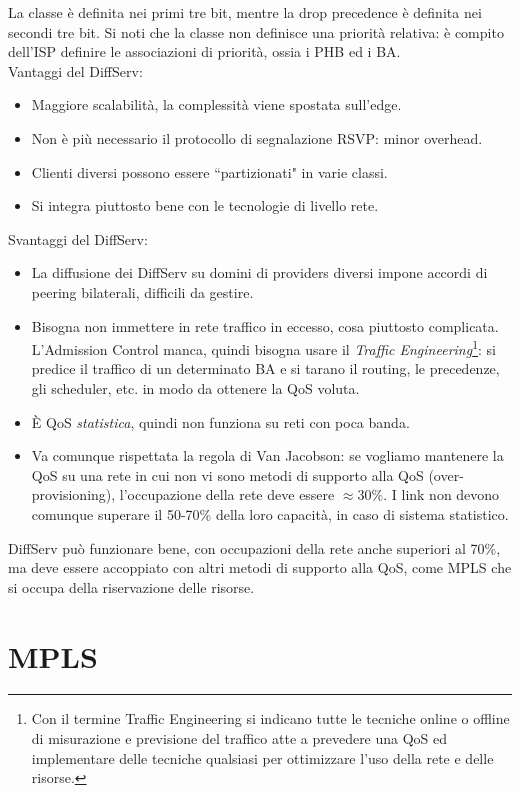 La classe è definita nei primi tre bit, mentre la drop precedence è definita nei secondi tre bit. Si noti che la classe non definisce una priorità relativa: è compito dell'ISP definire le associazioni di priorità, ossia i PHB ed i BA.\\
Vantaggi del DiffServ:
\begin{itemize}
	\item Maggiore scalabilità, la complessità viene spostata sull'edge.
	\item Non è più necessario il protocollo di segnalazione RSVP: minor overhead.
	\item Clienti diversi possono essere \textquotedblleft partizionati" in varie classi.
	\item Si integra piuttosto bene con le tecnologie di livello rete.
\end{itemize}
Svantaggi del DiffServ:
\begin{itemize}
	\item La diffusione dei DiffServ su domini di providers diversi impone accordi di peering bilaterali, difficili da gestire.
	\item Bisogna non immettere in rete traffico in eccesso, cosa piuttosto complicata. L'Admission Control manca, quindi bisogna usare il \textit{Traffic Engineering}\footnote{Con il termine Traffic Engineering si indicano tutte le tecniche online o offline di misurazione e previsione del traffico atte a prevedere una QoS ed implementare delle tecniche qualsiasi per ottimizzare l'uso della rete e delle risorse.}: si predice il traffico di un determinato BA e si tarano il
	routing, le precedenze, gli scheduler, etc. in modo da ottenere la QoS voluta.
	\item È QoS \textit{statistica}, quindi non funziona su reti con poca banda.
	\item Va comunque rispettata la regola di Van Jacobson: se vogliamo mantenere la QoS su una rete in cui non vi sono metodi di supporto alla QoS (over-provisioning), l'occupazione della rete deve essere $\approx 30\%$. I link non devono comunque superare il 50-70\% della loro capacità, in caso di sistema statistico.
\end{itemize}
DiffServ può funzionare bene, con occupazioni della rete anche superiori al 70\%, ma deve essere accoppiato con altri metodi di supporto alla QoS, come MPLS che si occupa della riservazione delle risorse.

\section{MPLS}






